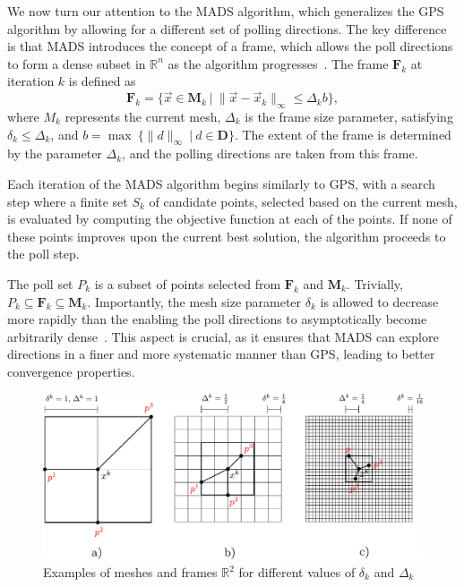 We now turn our attention to the MADS algorithm, which generalizes the GPS algorithm by allowing for a different set of polling directions. The key difference is that MADS introduces the concept of a frame, which allows the poll directions to form a dense subset in $ \mathbb{R}^{n} $ as the algorithm progresses~\cite{BBO-textbook, derivative-free-review}. The frame $\mathbf{F}_k$ at iteration $k$ is defined as
\begin{equation}
	\mathbf{F}_k = \{ \vec{x} \in \mathbf{M}_k \ \big| \ \| \vec{x} - \vec{x}_k \|_\infty \leq \Delta_k b \},
\end{equation}
where $M_k$ represents the current mesh, $ \Delta_k $ is the frame size parameter, satisfying $ \delta_k \leq \Delta_k $, and $b = \max \ \{ \| d \| _\infty \ \big| \ d \in \mathbf{D} \}$. The extent of the frame is determined by the parameter $ \Delta_k $, and the polling directions are taken from this frame.

Each iteration of the MADS algorithm begins similarly to GPS, with a search step where a finite set $S_k$ of candidate points, selected based on the current mesh, is evaluated by computing the objective function at each of the points. If none of these points improves upon the current best solution, the algorithm proceeds to the poll step. 
 
The poll set $P_k$ is a subset of points selected from $\mathbf{F}_k$ and $\mathbf{M}_k$. Trivially, $P_k \subseteq \mathbf{F}_k \subseteq \mathbf{M}_k$. Importantly, the mesh size parameter $ \delta_k $ is allowed to decrease more rapidly than the  enabling the poll directions to asymptotically become arbitrarily dense~\cite{Audet2006}. This aspect is crucial, as it ensures that MADS can explore directions in a finer and more systematic manner than GPS, leading to better convergence properties.


\begin{figure}[H]
	\centering
	\vspace{0.5cm}
	\includegraphics[width=1.01\textwidth]{figures/mads.pdf}
	\caption{Examples of meshes and frames $\mathbb{R}^2$ for different
		values of $\delta_k$ and $\Delta_k$}
	\label{fig:mads}
\end{figure}

